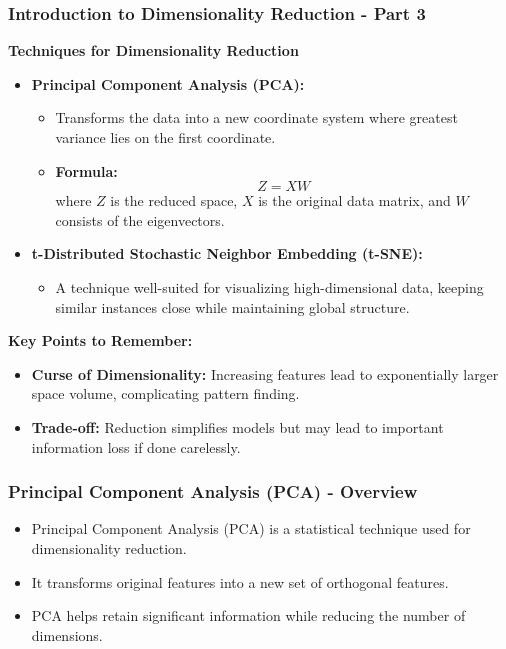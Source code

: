\documentclass{beamer}
\begin{document}
\begin{frame}[fragile]
    \frametitle{Introduction to Dimensionality Reduction - Part 3}
    \textbf{Techniques for Dimensionality Reduction}
    \begin{itemize}
        \item \textbf{Principal Component Analysis (PCA):} 
        \begin{itemize}
            \item Transforms the data into a new coordinate system where greatest variance lies on the first coordinate.
            \item \textbf{Formula:} 
            \[
            Z = XW
            \]
            where \(Z\) is the reduced space, \(X\) is the original data matrix, and \(W\) consists of the eigenvectors.
        \end{itemize}
        
        \item \textbf{t-Distributed Stochastic Neighbor Embedding (t-SNE):}
        \begin{itemize}
            \item A technique well-suited for visualizing high-dimensional data, keeping similar instances close while maintaining global structure.
        \end{itemize}
    \end{itemize}
    
    \textbf{Key Points to Remember:}
    \begin{itemize}
        \item \textbf{Curse of Dimensionality:} Increasing features lead to exponentially larger space volume, complicating pattern finding.
        \item \textbf{Trade-off:} Reduction simplifies models but may lead to important information loss if done carelessly.
    \end{itemize}
\end{frame}

\begin{frame}[fragile]
    \frametitle{Principal Component Analysis (PCA) - Overview}
    \begin{itemize}
        \item Principal Component Analysis (PCA) is a statistical technique used for dimensionality reduction.
        \item It transforms original features into a new set of orthogonal features.
        \item PCA helps retain significant information while reducing the number of dimensions.
    \end{itemize}
\end{frame}
\end{document}
